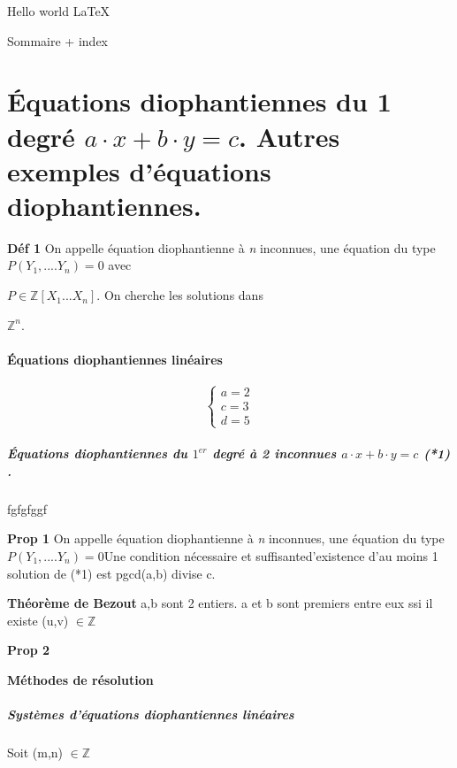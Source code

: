 \documentclass{article}
\begin{document}
Hello world \LaTeX

Sommaire + index


\part{Équations diophantiennes du
%
1\ier{}  degré $a \cdot x+b \cdot y=c$. Autres exemples d'équations diophantiennes.}

\textbf{Déf 1}
On appelle équation diophantienne à \textit{n} inconnues, une équation du type $P(Y_{1},....Y_{n})=0$ avec

$P \in \mathbb{Z}[X_{1}...X_{n}]$. On cherche les solutions dans
%


$\mathbb{Z}^{n}$.
\subsection{Équations diophantiennes linéaires}
\[\begin{cases} a = 2 \\  c = 3 \\ d = 5 \end{cases}\]


\subsubsection{Équations diophantiennes du $1^{er}$ degré à 2 inconnues $a \cdot x+b \cdot y=c$ (*1) .}
fgfgfggf



\textbf{Prop 1}
On appelle équation diophantienne à \textit{n} inconnues, une équation du type $P(Y_{1},....Y_{n})=0$Une condition nécessaire et suffisanted'existence d'au moins 1 solution de (*1) est pgcd(a,b) divise c.


\textbf{Théorème de Bezout}
a,b sont 2 entiers. a et b sont premiers entre eux ssi il existe (u,v) $\in \mathbb{Z}$

\textbf{Prop 2}

\textbf{Méthodes de résolution}


\subsubsection{Systèmes d'équations diophantiennes linéaires}
Soit (m,n) $\in \mathbb{Z}$
\end{document}
